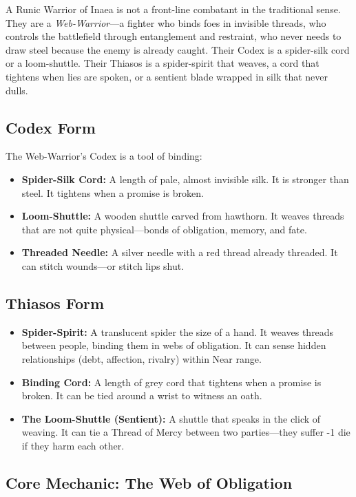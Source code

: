 A Runic Warrior of Inaea is not a front-line combatant in the traditional sense. They are a \textit{Web-Warrior}—a fighter who binds foes in invisible threads, who controls the battlefield through entanglement and restraint, who never needs to draw steel because the enemy is already caught. Their Codex is a spider-silk cord or a loom-shuttle. Their Thiasos is a spider-spirit that weaves, a cord that tightens when lies are spoken, or a sentient blade wrapped in silk that never dulls.

\subsection{Codex Form}

The Web-Warrior's Codex is a tool of binding:

\begin{itemize}
\item \textbf{Spider-Silk Cord:} A length of pale, almost invisible silk. It is stronger than steel. It tightens when a promise is broken.
\item \textbf{Loom-Shuttle:} A wooden shuttle carved from hawthorn. It weaves threads that are not quite physical—bonds of obligation, memory, and fate.
\item \textbf{Threaded Needle:} A silver needle with a red thread already threaded. It can stitch wounds—or stitch lips shut.
\end{itemize}

\subsection{Thiasos Form}

\begin{itemize}
\item \textbf{Spider-Spirit:} A translucent spider the size of a hand. It weaves threads between people, binding them in webs of obligation. It can sense hidden relationships (debt, affection, rivalry) within Near range.
\item \textbf{Binding Cord:} A length of grey cord that tightens when a promise is broken. It can be tied around a wrist to witness an oath.
\item \textbf{The Loom-Shuttle (Sentient):} A shuttle that speaks in the click of weaving. It can tie a Thread of Mercy between two parties—they suffer -1 die if they harm each other.
\end{itemize}

\subsection{Core Mechanic: The Web of Obligation}

